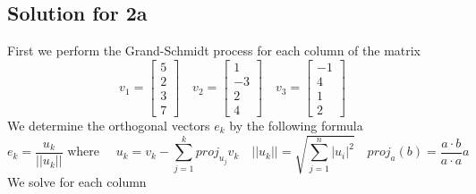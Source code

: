 \documentclass[a4paper,fleqn,12pt]{article}
\begin{document}
\subsection{Solution for 2a}
First we perform the Grand-Schmidt process for each column of the matrix
$$
v_1 = \begin{bmatrix} 5 \\ 2 \\ 3 \\ 7   \end{bmatrix} \quad
v_2 = \begin{bmatrix} 1 \\ -3 \\2 \\ 4  \end{bmatrix} \quad
v_3 = \begin{bmatrix} -1\\ 4 \\ 1 \\ 2   \end{bmatrix}
$$
We determine the orthogonal vectors $e_k$ by the following formula
$$
e_k = \frac{u_k}{|| u_k ||} \text{ where } \quad u_k = v_k - \sum_{j=1} ^{k} proj_{u_j} v_k \quad ||u_k||  =  \sqrt{\sum_{j=1} ^n  |u_i|^2} \quad proj_a(b) = \frac{a \cdot b}{a \cdot a}a
$$
We solve for each column
\end{document}
